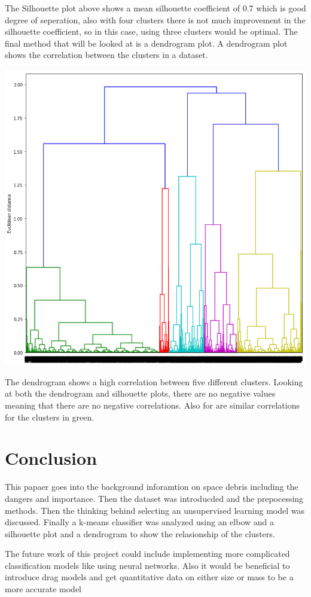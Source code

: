 \documentclass[12pt,a4paper]{article}
\begin{document}
The Silhouette plot above shows a mean silhouette coefficient of 0.7 which is good degree of seperation, also with four clusters there is not much improvement in the silhouette coefficient, so in this case, using three clusters would be optimal.
The final method that will be looked at is a dendrogram plot. A dendrogram plot shows the correlation between the clusters in a dataset.
\begin{center}
	\includegraphics[scale=0.3]{figures/dendrogram.png}
	\label{fig:dendrogram}
\end{center}
The dendrogram shows a high correlation between five different clusters. Looking at both the dendrogram and silhouette plots, there are no negative values meaning that there are no negative correlations. Also for are similar correlations for the clusters in green.
\section{Conclusion}
This papaer goes into the background inforamtion on space debris including the dangers and importance. Then the dataset was introducded and the prepocessing methods. Then the thinking behind selecting an unsupervised learning model was discussed. Finally a k-means classifier was analyzed using an elbow and a silhouette plot and a dendrogram to show the relasionship of the clusters.

The future work of this project could include implementing more complicated classification models like using neural networks. Also it would be beneficial to introduce drag models and get quantitative data on either size or mass to be a more accurate model 
 
 
\end{document}
